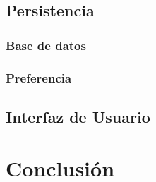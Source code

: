 \subsection{Persistencia}

\subsubsection{Base de datos}

\subsubsection{Preferencia}

\subsection{Interfaz de Usuario}

\section{Conclusión}

\label{sec56:conclusion}
